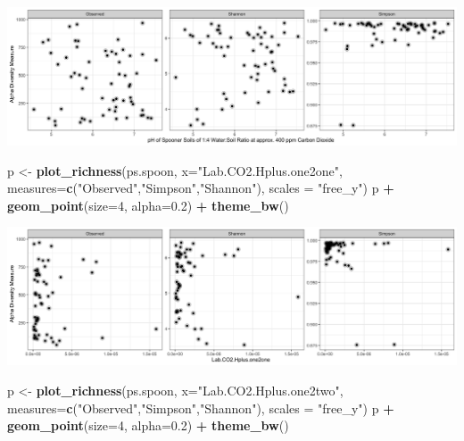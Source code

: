 \documentclass[]{article}
\newenvironment{Shaded}{\begin{snugshade}}{\end{snugshade}}
\newcommand{\DataTypeTok}[1]{\textcolor[rgb]{0.13,0.29,0.53}{#1}}
\newcommand{\DecValTok}[1]{\textcolor[rgb]{0.00,0.00,0.81}{#1}}
\newcommand{\FloatTok}[1]{\textcolor[rgb]{0.00,0.00,0.81}{#1}}
\newcommand{\KeywordTok}[1]{\textcolor[rgb]{0.13,0.29,0.53}{\textbf{#1}}}
\newcommand{\NormalTok}[1]{#1}
\newcommand{\OperatorTok}[1]{\textcolor[rgb]{0.81,0.36,0.00}{\textbf{#1}}}
\newcommand{\StringTok}[1]{\textcolor[rgb]{0.31,0.60,0.02}{#1}}
\begin{document}
\includegraphics{output-rmd/richness-ph-Lab.CO2.pH.one2four.spoon-1.png}

\begin{Shaded}
\begin{Highlighting}[]
\NormalTok{p <-}\StringTok{ }\KeywordTok{plot_richness}\NormalTok{(ps.spoon, }\DataTypeTok{x=}\StringTok{"Lab.CO2.Hplus.one2one"}\NormalTok{, }\DataTypeTok{measures=}\KeywordTok{c}\NormalTok{(}\StringTok{"Observed"}\NormalTok{,}\StringTok{"Simpson"}\NormalTok{,}\StringTok{"Shannon"}\NormalTok{), }\DataTypeTok{scales =} \StringTok{"free_y"}\NormalTok{)}
\NormalTok{p }\OperatorTok{+}\StringTok{ }\KeywordTok{geom_point}\NormalTok{(}\DataTypeTok{size=}\DecValTok{4}\NormalTok{, }\DataTypeTok{alpha=}\FloatTok{0.2}\NormalTok{) }\OperatorTok{+}\StringTok{ }\KeywordTok{theme_bw}\NormalTok{()}
\end{Highlighting}
\end{Shaded}

\includegraphics{output-rmd/richness-ph-Lab.CO2.Hplus.one2one.spoon-1.png}

\begin{Shaded}
\begin{Highlighting}[]
\NormalTok{p <-}\StringTok{ }\KeywordTok{plot_richness}\NormalTok{(ps.spoon, }\DataTypeTok{x=}\StringTok{"Lab.CO2.Hplus.one2two"}\NormalTok{, }\DataTypeTok{measures=}\KeywordTok{c}\NormalTok{(}\StringTok{"Observed"}\NormalTok{,}\StringTok{"Simpson"}\NormalTok{,}\StringTok{"Shannon"}\NormalTok{), }\DataTypeTok{scales =} \StringTok{"free_y"}\NormalTok{)}
\NormalTok{p }\OperatorTok{+}\StringTok{ }\KeywordTok{geom_point}\NormalTok{(}\DataTypeTok{size=}\DecValTok{4}\NormalTok{, }\DataTypeTok{alpha=}\FloatTok{0.2}\NormalTok{) }\OperatorTok{+}\StringTok{ }\KeywordTok{theme_bw}\NormalTok{()}
\end{Highlighting}
\end{Shaded}
\end{document}
